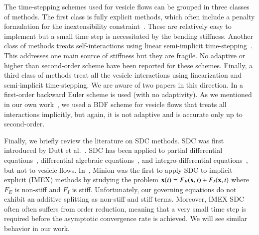 The time-stepping schemes used for vesicle flows can be grouped in
three classes of methods. The first class is fully explicit methods,
which often include a penalty formulation for the inextensibility
constraint~\cite{suk:sei2001, soh:tse:li:voi:low2010, ram:poz1998,
kim:lai2010, laa:sar:mis2014, hsi:lai:yan:you2013}.  These are
relatively easy to implement but a small time step is necessitated by
the bending stiffness. Another class of methods treats
self-interactions using linear semi-implicit
time-stepping~\cite{vee:gue:zor:bir2009, rah:vee:bir2010, zha:sha2013b,
zha:sha2011a}.  This addresses one main source of stiffness but they
are fragile. No adaptive or higher than second-order scheme have been
reported for these schemes. Finally, a third class of methods treat all
the vesicle interactions using linearization and semi-implicit
time-stepping. We are aware of two papers in this direction.  In
\cite{zha:sha2013b} a first-order backward Euler scheme is used (with
no adaptivity). As we mentioned in our own work~\cite{qua:bir2014b,
rah:vee:zor:bir2012}, we used a BDF scheme for vesicle flows that
treats all interactions implicitly, but again, it is not adaptive and
is accurate only up to second-order.

Finally, we briefly review the literature on SDC methods.  SDC was
first introduced by Dutt et al.~\cite{dut:gre:rok2000}.  SDC has been
applied to partial differential equations~\cite{bou:lay:min2003,
chr:hay:ong2012, emm:min2012, min:spe:bol:emm:rup2015,
spe:rup:emm:min:bol:kra2014, jia:hua2008, spe:rup:emm:bol:kra2014},
differential algebraic equations~\cite{bu:hua:min2012,
hua:jia:min2007}, and integro-differential
equations~\cite{hua:lai:xia2006}, but not to vesicle flows.
In~\cite{min2003}, Minion was the first to apply SDC to
implicit-explicit (IMEX) methods by studying the problem $\dot{{\mathbf{x}}}(t)
= F_{E}({\mathbf{x}},t) + F_{I}({\mathbf{x}},t)$ where $F_{E}$ is non-stiff and $F_{I}$
is stiff.  Unfortunately, our governing equations do not exhibit an
additive splitting as non-stiff and stiff terms.  Moreover, IMEX SDC
often often suffers from order reduction, meaning that a very small
time step is required before the asymptotic convergence rate is
achieved.  We will see similar behavior in our work.

